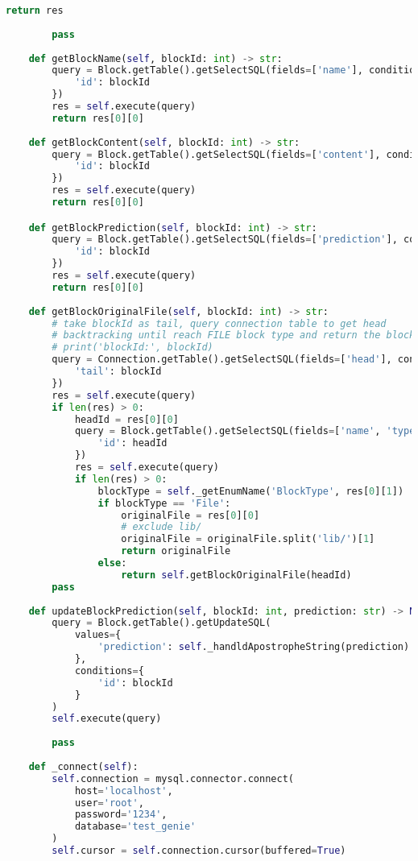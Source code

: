 \begin{lstlisting}[language=Python, caption={$\texttt{DBMS}$ class.}, label={lst:21}]
        return res
        
        pass
    
    def getBlockName(self, blockId: int) -> str:
        query = Block.getTable().getSelectSQL(fields=['name'], conditions={
            'id': blockId
        })
        res = self.execute(query)
        return res[0][0]
    
    def getBlockContent(self, blockId: int) -> str:
        query = Block.getTable().getSelectSQL(fields=['content'], conditions={
            'id': blockId
        })
        res = self.execute(query)
        return res[0][0]

    def getBlockPrediction(self, blockId: int) -> str:
        query = Block.getTable().getSelectSQL(fields=['prediction'], conditions={
            'id': blockId
        })
        res = self.execute(query)
        return res[0][0]
    
    def getBlockOriginalFile(self, blockId: int) -> str:
        # take blockId as tail, query connection table to get head
        # backtracking until reach FILE block type and return the blockname
        # print('blockId:', blockId)
        query = Connection.getTable().getSelectSQL(fields=['head'], conditions={
            'tail': blockId
        })
        res = self.execute(query)
        if len(res) > 0:
            headId = res[0][0]
            query = Block.getTable().getSelectSQL(fields=['name', 'type'], conditions={
                'id': headId
            })
            res = self.execute(query)
            if len(res) > 0:
                blockType = self._getEnumName('BlockType', res[0][1])
                if blockType == 'File':
                    originalFile = res[0][0]
                    # exclude lib/
                    originalFile = originalFile.split('lib/')[1]
                    return originalFile
                else:
                    return self.getBlockOriginalFile(headId)
        pass
    
    def updateBlockPrediction(self, blockId: int, prediction: str) -> None:
        query = Block.getTable().getUpdateSQL(
            values={
                'prediction': self._handldApostropheString(prediction)
            },
            conditions={
                'id': blockId
            }
        )
        self.execute(query)
        
        pass    
        
    def _connect(self):
        self.connection = mysql.connector.connect(
            host='localhost',
            user='root',
            password='1234',
            database='test_genie'
        )
        self.cursor = self.connection.cursor(buffered=True)
        

\end{lstlisting}
